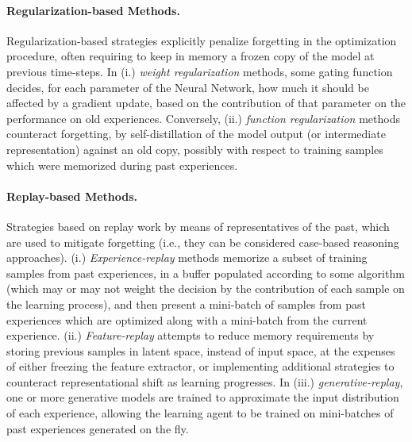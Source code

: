 \paragraph{Regularization-based Methods.} Regularization-based strategies explicitly penalize forgetting in the optimization procedure, often requiring to keep in memory a frozen copy of the model at previous time-steps. In (i.) \textit{weight regularization} methods, some gating function decides, for each parameter of the Neural Network, how much it should be affected by a gradient update, based on the contribution of that parameter on the performance on old experiences. Conversely, (ii.) \textit{function regularization} methods counteract forgetting, by self-distillation of the model output (or intermediate representation) against an old copy, possibly with respect to training samples which were memorized during past experiences.

\paragraph{Replay-based Methods.} Strategies based on replay work by means of representatives of the past, which are used to mitigate forgetting (i.e., they can be considered case-based reasoning approaches). (i.) \textit{Experience-replay} methods memorize a subset of training samples from past experiences, in a buffer populated according to some algorithm (which may or may not weight the decision by the contribution of each sample on the learning process), and then present a mini-batch of samples from past experiences which are optimized along with a mini-batch from the current experience. (ii.) \textit{Feature-replay} attempts to reduce memory requirements by storing previous samples in latent space, instead of input space, at the expenses of either freezing the feature extractor, or implementing additional strategies to counteract representational shift as learning progresses. In (iii.) \textit{generative-replay}, one or more generative models are trained to approximate the input distribution of each experience, allowing the learning agent to be trained on mini-batches of past experiences generated on the fly. 

